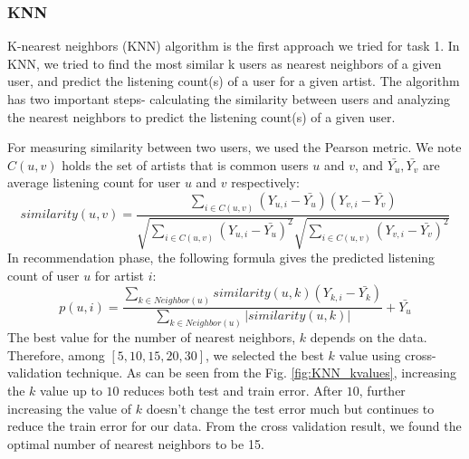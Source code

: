 
\subsubsection{KNN}
K-nearest neighbors (KNN) algorithm is the first approach we tried for task 1. In KNN, we tried to find the most similar k users as nearest neighbors of a given user, and predict the listening count(s) of a user for a given artist. The algorithm has two important steps- calculating the similarity between users and analyzing the nearest neighbors to predict the listening count(s) of a given user. 

For measuring similarity between two users, we used the Pearson metric. We note $C(u,v)$ holds the set of artists that is common users $u$ and $v$, and $\bar{Y_u}, \bar{Y_v}$  are average listening count for user $u$ and $v$ respectively:
\begin{equation}
  similarity(u, v)=\frac{\sum_{i\in C(u,v)} (Y_{u,i} - \bar{Y_u})(Y_{v,i} - \bar{Y_v})}{\sqrt{\sum_{i\in C(u,v)} (Y_{u,i} - \bar{Y_{u}})^2} \sqrt{\sum_{i\in C(u,v)} (Y_{v,i} - \bar{Y_{v}})^2}}
\end{equation}
In recommendation phase, the following formula gives the predicted listening count of user $u$ for artist $i$:
 \begin{equation}
  p(u, i)=\frac{\sum_{k \in Neighbor(u)} similarity(u, k) (Y_{k,i} - \bar{Y_k})}{\sum_{k \in Neighbor(u)} | similarity(u, k) |} + \bar{Y_u}
\end{equation}
The best value for the number of nearest neighbors, $k$ depends on the data. Therefore, among $[5, 10, 15, 20, 30]$, we selected the best $k$ value using cross-validation technique. As can be seen from the Fig. \ref{fig:KNN_kvalues}, increasing the $k$ value up to $10$ reduces both test and train error. After $10$, further increasing the value of $k$ doesn't change the test error much but continues to reduce the train error for our data. From the cross validation result, we found the optimal number of nearest neighbors to be 15.

